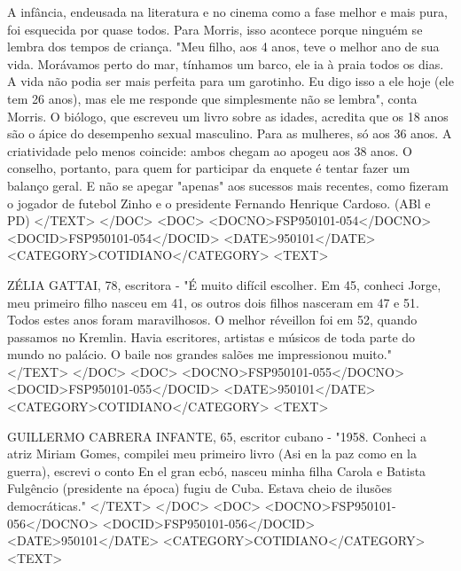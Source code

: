 A infância, endeusada na literatura e no cinema como a fase melhor e mais pura, foi esquecida por quase todos. Para Morris, isso acontece porque ninguém se lembra dos tempos de criança.
"Meu filho, aos 4 anos, teve o melhor ano de sua vida. Morávamos perto do mar, tínhamos um barco, ele ia à praia todos os dias. A vida não podia ser mais perfeita para um garotinho. Eu digo isso a ele hoje (ele tem 26 anos), mas ele me responde que simplesmente não se lembra", conta Morris.
O biólogo, que escreveu um livro sobre as idades, acredita que os 18 anos são o ápice do desempenho sexual masculino. Para as mulheres, só aos 36 anos. A criatividade pelo menos coincide: ambos chegam ao apogeu aos 38 anos.
O conselho, portanto, para quem for participar da enquete é tentar fazer um balanço geral. E não se apegar "apenas" aos sucessos mais recentes, como fizeram o jogador de futebol Zinho e o presidente Fernando Henrique Cardoso.
(ABl e PD)
</TEXT>
</DOC>
<DOC>
<DOCNO>FSP950101-054</DOCNO>
<DOCID>FSP950101-054</DOCID>
<DATE>950101</DATE>
<CATEGORY>COTIDIANO</CATEGORY>
<TEXT>

ZÉLIA GATTAI, 78, escritora - "É muito difícil escolher. Em 45, conheci Jorge, meu primeiro filho nasceu em 41, os outros dois filhos nasceram em 47 e 51. Todos estes anos foram maravilhosos. O melhor réveillon foi em 52, quando passamos no Kremlin. Havia escritores, artistas e músicos de toda parte do mundo no palácio. O baile nos grandes salões me impressionou muito."
</TEXT>
</DOC>
<DOC>
<DOCNO>FSP950101-055</DOCNO>
<DOCID>FSP950101-055</DOCID>
<DATE>950101</DATE>
<CATEGORY>COTIDIANO</CATEGORY>
<TEXT>

GUILLERMO CABRERA INFANTE, 65, escritor cubano - "1958. Conheci a atriz Miriam Gomes, compilei meu primeiro livro (Asi en la paz como en la guerra), escrevi o conto En el gran ecbó, nasceu minha filha Carola e Batista Fulgêncio (presidente na época) fugiu de Cuba. Estava cheio de ilusões democráticas."
</TEXT>
</DOC>
<DOC>
<DOCNO>FSP950101-056</DOCNO>
<DOCID>FSP950101-056</DOCID>
<DATE>950101</DATE>
<CATEGORY>COTIDIANO</CATEGORY>
<TEXT>

